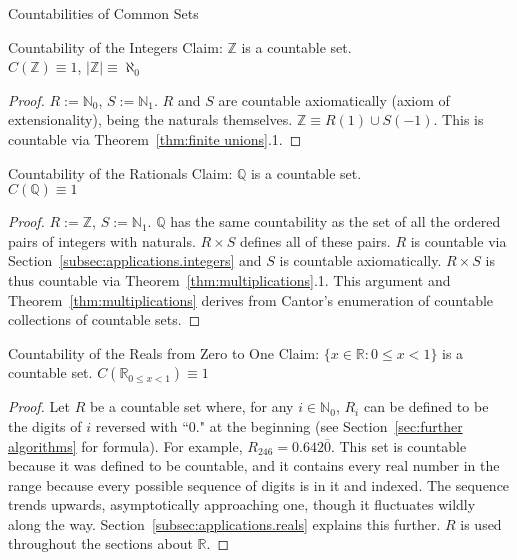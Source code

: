 \documentclass[12pt]{article}
\begin{document}
\begin{section}{Countabilities of Common Sets}\label{sec:applications}
	\begin{subsection}{Countability of the Integers}\label{subsec:applications.integers}
		Claim: $\mathbb Z$ is a countable set.\\
		\indent$C(\mathbb Z)\equiv1$,
		\hspace{2em}
		$|\mathbb Z|\equiv\aleph_0$
		\begin{proof}
			$R:=\mathbb N_0$, $S:=\mathbb N_1$. $R$ and $S$ are countable axiomatically
			(axiom of extensionality), being the naturals themselves. $\mathbb Z\equiv
			R(1)\cup S(-1)$. This is countable via Theorem~\ref{thm:finite unions}.1.
		\end{proof}
	\end{subsection}

	\begin{subsection}{Countability of the Rationals}\label{subsec:applications.rationals}
		Claim: $\mathbb Q$ is a countable set.\\
		\indent$C(\mathbb Q)\equiv1$
		\begin{proof}
			$R:=\mathbb Z$, $S:=\mathbb N_1$. $\mathbb Q$ has the same countability as the set of all
			the ordered pairs of integers with naturals. $R\times S$ defines all of these pairs. $R$
			is countable via Section~\ref{subsec:applications.integers} and $S$ is countable
			axiomatically. $R\times S$ is thus countable via Theorem~\ref{thm:multiplications}.1.
			This argument and Theorem~\ref{thm:multiplications} derives from Cantor's enumeration of
			countable collections of countable sets.
		\end{proof}
	\end{subsection}

	\begin{subsection}{Countability of the Reals from Zero to One}\label{subsec:applications.reals 0 to 1}
		Claim: $\{x\in\mathbb R:0\leqslant x<1\}$ is a countable set.
		\hspace{2em}$C(\mathbb R_{0\leqslant x<1})\equiv1$
		\begin{proof}
			Let $R$ be a countable set where, for any $i\in\mathbb N_0$, $R_i$ can be defined to be
			the digits of $i$ reversed with ``0." at the beginning (see Section~\ref{sec:further algorithms}
			for formula). For example, $R_{246}=0.642\overline0$. This set is countable because it
			was defined to be countable, and it contains every real number in the range because every
			possible sequence of digits is in it and indexed. The sequence trends upwards,
			asymptotically approaching one, though it fluctuates wildly along the way.
			Section~\ref{subsec:applications.reals} explains this further. $R$ is used throughout the
			sections about $\mathbb R$.
		\end{proof}
	\end{subsection}


\end{section}
\end{document}

